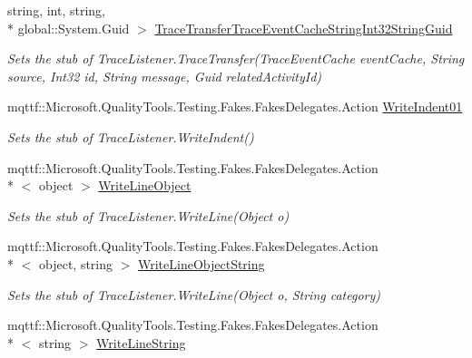 \begin{DoxyCompactItemize}
string, int, string, \\*
global\-::\-System.\-Guid $>$ \hyperlink{class_system_1_1_diagnostics_1_1_fakes_1_1_stub_delimited_list_trace_listener_a5ebb88d462c44eac4d56cbcd115ab501}{Trace\-Transfer\-Trace\-Event\-Cache\-String\-Int32\-String\-Guid}
\begin{DoxyCompactList}\small\item\em Sets the stub of Trace\-Listener.\-Trace\-Transfer(\-Trace\-Event\-Cache event\-Cache, String source, Int32 id, String message, Guid related\-Activity\-Id)\end{DoxyCompactList}\item 
mqttf\-::\-Microsoft.\-Quality\-Tools.\-Testing.\-Fakes.\-Fakes\-Delegates.\-Action \hyperlink{class_system_1_1_diagnostics_1_1_fakes_1_1_stub_delimited_list_trace_listener_afefd817fdb81365f5420a4c58fdd6025}{Write\-Indent01}
\begin{DoxyCompactList}\small\item\em Sets the stub of Trace\-Listener.\-Write\-Indent()\end{DoxyCompactList}\item 
mqttf\-::\-Microsoft.\-Quality\-Tools.\-Testing.\-Fakes.\-Fakes\-Delegates.\-Action\\*
$<$ object $>$ \hyperlink{class_system_1_1_diagnostics_1_1_fakes_1_1_stub_delimited_list_trace_listener_af7df30a577d7e644edf971372a432234}{Write\-Line\-Object}
\begin{DoxyCompactList}\small\item\em Sets the stub of Trace\-Listener.\-Write\-Line(\-Object o)\end{DoxyCompactList}\item 
mqttf\-::\-Microsoft.\-Quality\-Tools.\-Testing.\-Fakes.\-Fakes\-Delegates.\-Action\\*
$<$ object, string $>$ \hyperlink{class_system_1_1_diagnostics_1_1_fakes_1_1_stub_delimited_list_trace_listener_a3a85897cf9ba57cbf19f179474b01c3c}{Write\-Line\-Object\-String}
\begin{DoxyCompactList}\small\item\em Sets the stub of Trace\-Listener.\-Write\-Line(\-Object o, String category)\end{DoxyCompactList}\item 
mqttf\-::\-Microsoft.\-Quality\-Tools.\-Testing.\-Fakes.\-Fakes\-Delegates.\-Action\\*
$<$ string $>$ \hyperlink{class_system_1_1_diagnostics_1_1_fakes_1_1_stub_delimited_list_trace_listener_aaaacbc6e31b66c0b7c93800ac97fb965}{Write\-Line\-String}

\end{DoxyCompactItemize}
